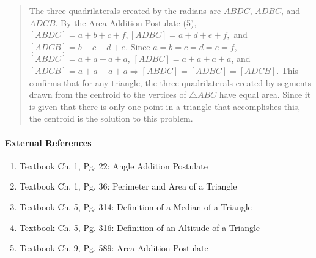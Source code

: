\documentclass[letterpaper,12pt,twoside]{report}
\begin{document}
\begin{quotation}
		The three quadrilaterals created by the radians are $ABDC$, $ADBC$, and $ADCB$. By the Area Addition Postulate (5), $[ABDC]=a+b+c+f, [ADBC]=a+d+e+f, $ and $[ADCB]=b+c+d+e$. Since $a=b=c=d=e=f$, $[ABDC]=a+a+a+a$, $[ADBC]=a+a+a+a$, and $[ADCB]=a+a+a+a \Rightarrow [ABDC]=[ADBC]=[ADCB]$. This confirms that for any triangle, the three quadrilaterals created by segments drawn from the centroid to the vertices of $\triangle ABC$ have equal area. Since it is given that there is only one point in a triangle that accomplishes this, the $\boxed{\text{centroid}}$ is the solution to this problem.
	\end{quotation}
	
	\paragraph{External References}
	
	\begin{enumerate}
		\item Textbook Ch. 1, Pg. 22: Angle Addition Postulate
		\item Textbook Ch. 1, Pg. 36: Perimeter and Area of a Triangle
		\item Textbook Ch. 5, Pg. 314: Definition of a Median of a Triangle
		\item Textbook Ch. 5, Pg. 316: Definition of an Altitude of a Triangle
		\item Textbook Ch. 9, Pg. 589: Area Addition Postulate
	\end{enumerate}
	
\end{document}
